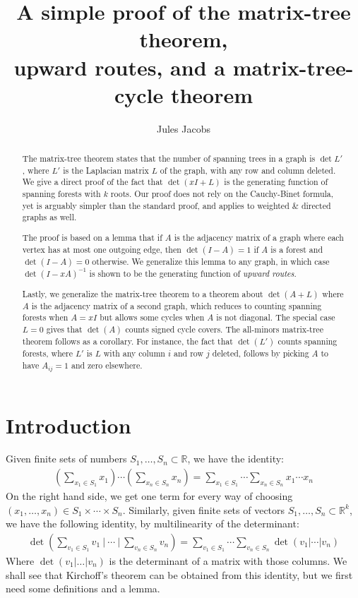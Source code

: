 \documentclass[a4paper, 11pt]{article}
\title{A simple proof of the matrix-tree theorem, \\ upward routes, and a matrix-tree-cycle theorem}
\author{Jules Jacobs}
\newcommand{\R}{\mathbb{R}}
\theoremstyle{definition}
\begin{document}
\maketitle

\begin{abstract}
  The matrix-tree theorem states that the number of spanning trees in a graph is $\det L'$, where $L'$ is the Laplacian matrix $L$ of the graph, with any row and column deleted. We give a direct proof of the fact that $\det(xI + L)$ is the generating function of spanning forests with $k$ roots. Our proof does not rely on the Cauchy-Binet formula, yet is arguably simpler than the standard proof, and applies to weighted \& directed graphs as well.

  The proof is based on a lemma that if $A$ is the adjacency matrix of a graph where each vertex has at most one outgoing edge, then $\det(I - A) = 1$ if $A$ is a forest and $\det(I - A) = 0$ otherwise. We generalize this lemma to any graph, in which case $\det(I-xA)^{-1}$ is shown to be the generating function of \emph{upward routes}.

  Lastly, we generalize the matrix-tree theorem to a theorem about $\det(A + L)$ where $A$ is the adjacency matrix of a second graph, which reduces to counting spanning forests when $A = xI$ but allows some cycles when $A$ is not diagonal. The special case $L=0$ gives that $\det(A)$ counts signed cycle covers. The all-minors matrix-tree theorem follows as a corollary. For instance, the fact that $\det(L')$ counts spanning forests, where $L'$ is $L$ with any column $i$ and row $j$ deleted, follows by picking $A$ to have $A_{ij} = 1$ and zero elsewhere.
\end{abstract}

\section{Introduction}

Given finite sets of numbers $S_1, \dots, S_n \subset \R$, we have the identity:
\begin{align*}
  \left( \sum_{x_1 \in S_1} x_1 \right) \cdots \left( \sum_{x_n \in S_n} x_n \right) =
  \sum_{x_1 \in S_1} \cdots \sum_{x_n \in S_n} x_1 \cdots x_n
\end{align*}
On the right hand side, we get one term for every way of choosing $(x_1,\dots,x_n)\in S_1 \times \cdots \times S_n$. Similarly, given finite sets of vectors $S_1, \dots, S_n \subset \R^k$, we have the following identity, by multilinearity of the determinant:
\begin{align*}
  \det\left(\sum_{v_1 \in S_1} v_1\ \bigg\rvert\ \cdots\ \bigg\rvert\ \sum_{v_n \in S_n} v_n\right) =
  \sum_{v_1 \in S_1} \cdots \sum_{v_n \in S_n} \det \left(v_1 | \cdots | v_n\right)
\end{align*}
Where $\det(v_1 | \dots | v_n)$ is the determinant of a matrix with those columns. We shall see that Kirchoff's theorem can be obtained from this identity, but we first need some definitions and a lemma.
\end{document}
